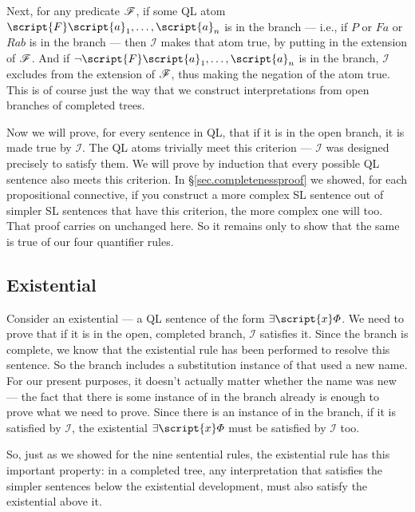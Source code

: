 Next, for any predicate $\mathscr{F}$\!, if some QL atom $\script{F}\script{a}_{1}, \ldots, \script{a}_{n}$ is in the branch --- i.e., if $P$ or $Fa$ or $Rab$ is in the branch --- then $\mathcal{I}$ makes that atom true, by putting  in the extension of $\mathscr{F}$\!. And if $\enot \script{F}\script{a}_{1}, \ldots, \script{a}_{n}$ is in the branch, $\mathcal{I}$ excludes  from the extension of $\mathscr{F}$\!, thus making the negation of the atom true. This is of course just the way that we construct interpretations from open branches of completed trees.

Now we will prove, for every sentence in QL, that if it is in the open branch, it is made true by $\mathcal{I}$. The QL atoms trivially meet this criterion --- $\mathcal{I}$ was designed precisely to satisfy them. We will prove by induction that every possible QL sentence also meets this criterion. In \S\ref{sec.completenessproof} we showed, for each propositional connective, if you construct a more complex SL sentence out of simpler SL sentences that have this criterion, the more complex one will too. That proof carries on unchanged here. So it remains only to show that the same is true of our four quantifier rules.

\subsection{Existential}

Consider an existential --- a QL sentence of the form $\exists \script{x} \metaA{}$. We need to prove that if it is in the open, completed branch, $\mathcal{I}$ satisfies it. Since the branch is complete, we know that the existential rule has been performed to resolve this sentence. So the branch includes a substitution instance of \metaA{} that used a new name. For our present purposes, it doesn't actually matter whether the name was new --- the fact that there is some instance of \metaA{} in the branch already is enough to prove what we need to prove. Since there is an instance of \metaA{} in the branch, if it is satisfied by $\mathcal{I}$, the existential $\exists \script{x} \metaA{}$ must be satisfied by $\mathcal{I}$ too.

So, just as we showed for the nine sentential rules, the existential rule has this important property: in a completed tree, any interpretation that satisfies the simpler sentences below the existential development, must also satisfy the existential above it.

